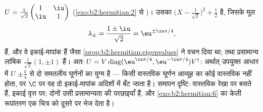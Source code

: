 \begin{example}[एक एकात्मक आव्यूह विकर्णित]\label{ex:b2:hermitian:unitary}
$U = \frac{1}{\sqrt2}\begin{pmatrix} 1 & \iu\\ \iu & 1
\end{pmatrix}$ (\cref{exo:b2:hermitian:2} से )। उसका  $\bigl(X - \frac{1}{\sqrt2}\bigr)^2
+ \frac12$ है, जिसके मूल
\[
\lambda_\pm = \frac{1 \pm \iu}{\sqrt2} = \eu^{\pm\iu\pi/4},
\]
हैं, और वे इकाई-मापांक हैं जैसा \cref{prop:b2:hermitian:eigenvalues} ने वचन दिया था; तथा प्रसामान्य लांबिक
 $\frac{1}{\sqrt2}(1, \pm1)$ हैं। अतः $U =
V\operatorname{diag}(\eu^{\iu\pi/4},
\eu^{-\iu\pi/4})V^\dagger$: अर्थात् उपयुक्त आधार में $U$ $\pm\frac\pi4$ से दो
समतलीय घूर्णनों का युग्म है --- किसी वास्तविक घूर्णन आव्यूह का कोई
वास्तविक  नहीं होता, पर $\C$ पर वह दो इकाई-मापांक अदिशों
में बँट जाता है। समापन दृष्टि:   वास्तविक रेखा पर बसते
हैं,   इकाई वृत्त पर; दोनों उसी प्रसामान्यता की परछाइयाँ
हैं, और \cref{exo:b2:hermitian:6} का केली रूपांतरण एक चित्र को दूसरे पर भेज देता है।
\end{example}

